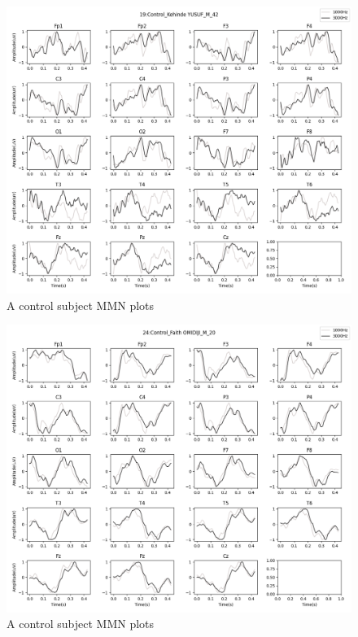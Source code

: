 \documentclass[10pt]{article}
\begin{document}
\begin{figure}[H]
  \includegraphics[width=16cm]{../../../data_analysis_results/MMN/time_series/Control/19.png}
  \caption{A control subject MMN plots}
\end{figure}
\begin{figure}[H]
  \includegraphics[width=16cm]{../../../data_analysis_results/MMN/time_series/Control/24.png}
  \caption{A control subject MMN plots}
\end{figure}
\end{document}
